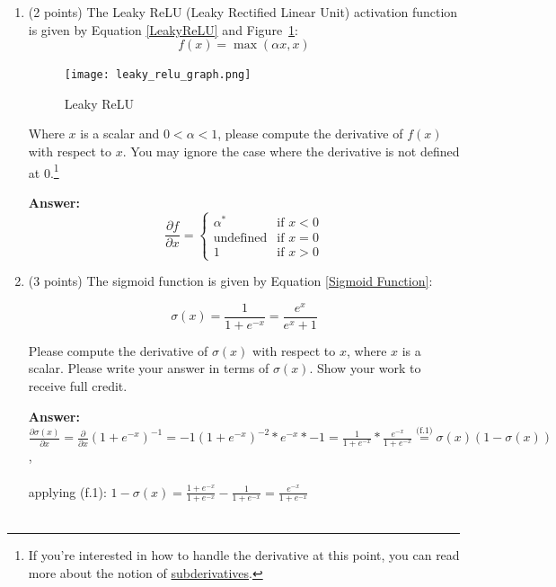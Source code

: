 \documentclass{article}
\newenvironment{answer}{
    {\bf Answer:} \sf \begingroup\color{red}
}{\endgroup}%
\begin{document}
\begin{enumerate}[label=(\alph*)]
\item (2 points) The Leaky ReLU (Leaky Rectified Linear Unit) activation function is given by Equation \ref{LeakyReLU} and Figure~\ref{fig:leaky_relu}:
\begin{equation}
    \label{LeakyReLU}
    f(x) = \max(\alpha x, x)
\end{equation}

\begin{figure}[h]
    \centering
    \texttt{[image: leaky\_relu\_graph.png]}
    \caption{Leaky ReLU}
    \label{fig:leaky_relu}
\end{figure}

Where $x$ is a scalar and $0<\alpha <1$, please compute the derivative of $f(x)$ with respect to $x$. You may ignore the case where the derivative is not defined at 0.\footnote{If you're interested in how to handle the derivative at this point, you can read more about the notion of \hyperref[https://en.wikipedia.org/wiki/Subderivative]{subderivatives}.}

\begin{shaded}
\begin{answer} \\
\[
   \frac{\partial f}{\partial x} =
\begin{cases}
    \alpha^*     & \text{if } x < 0 \\
    \text{undefined} & \text{if } x = 0 \\
    1           & \text{if } x > 0
\end{cases}
\]
\end{answer}
\end{shaded}

\item (3 points) The sigmoid function is given by Equation \ref{Sigmoid Function}:

\begin{equation}
    \label{Sigmoid Function}
    \sigma (x) = \frac{1}{1 + e^{-x}} = \frac{e^{x}}{e^{x} + 1}
\end{equation}

Please compute the derivative of $\sigma(x)$ with respect to $x$, where $x$ is a scalar. Please write your answer in terms of $\sigma(x)$. Show your work to receive full credit.

\begin{shaded}
\begin{answer} \\
$\frac{\partial \sigma(x)}{\partial x}
= \frac{\partial}{\partial x} (1 + e^{-x})^{-1}
= -1(1+e^{-x})^{-2} * e^{-x} * -1
= \frac{1}{1+e^{-x}} * \frac{e^{-x}}{1+e^{-x}}
\stackrel{\text{(f.1)}}{=}  \sigma(x) (1 - \sigma(x))$, \\ \\
applying (f.1): $1 - \sigma(x) = \frac{1+e^{-x}}{1+e^{-x}} - \frac{1}{1+e^{-x}} =  \frac{e^{-x}}{1+e^{-x}}$  \\ \\
\end{answer}
\end{shaded}


\end{enumerate}
\end{document}
